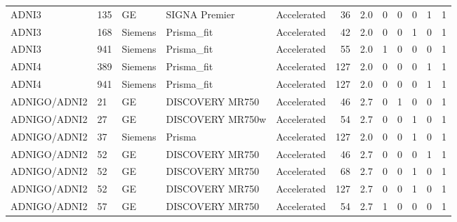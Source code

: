 \documentclass{article}
\providecommand{\DIFaddtex}[1]{{\protect\color{blue}#1}} %
\providecommand{\DIFadd}[1]{\texorpdfstring{\DIFaddtex{#1}}{#1}} %
\begin{document}
\begin{landscape}
\begin{longtable}{lllllrrrrrrr}
\DIFadd{ADNI3 }& \DIFadd{135 }& \DIFadd{GE }& \DIFadd{SIGNA Premier }& \DIFadd{Accelerated }& \DIFadd{36 }& \DIFadd{2.0 }& \DIFadd{0 }& \DIFadd{0 }& \DIFadd{0 }& \DIFadd{1 }& \DIFadd{1 }\\
\DIFadd{ADNI3 }& \DIFadd{168 }& \DIFadd{Siemens }& \DIFadd{Prisma\_fit }& \DIFadd{Accelerated }& \DIFadd{42 }& \DIFadd{2.0 }& \DIFadd{0 }& \DIFadd{0 }& \DIFadd{1 }& \DIFadd{0 }& \DIFadd{1 }\\
\DIFadd{ADNI3 }& \DIFadd{941 }& \DIFadd{Siemens }& \DIFadd{Prisma\_fit }& \DIFadd{Accelerated }& \DIFadd{55 }& \DIFadd{2.0 }& \DIFadd{1 }& \DIFadd{0 }& \DIFadd{0 }& \DIFadd{0 }& \DIFadd{1 }\\
\DIFadd{ADNI4 }& \DIFadd{389 }& \DIFadd{Siemens }& \DIFadd{Prisma\_fit }& \DIFadd{Accelerated }& \DIFadd{127 }& \DIFadd{2.0 }& \DIFadd{0 }& \DIFadd{0 }& \DIFadd{0 }& \DIFadd{1 }& \DIFadd{1 }\\
\DIFadd{ADNI4 }& \DIFadd{941 }& \DIFadd{Siemens }& \DIFadd{Prisma\_fit }& \DIFadd{Accelerated }& \DIFadd{127 }& \DIFadd{2.0 }& \DIFadd{0 }& \DIFadd{0 }& \DIFadd{0 }& \DIFadd{1 }& \DIFadd{1 }\\
\DIFadd{ADNIGO/ADNI2 }& \DIFadd{21 }& \DIFadd{GE }& \DIFadd{DISCOVERY MR750 }& \DIFadd{Accelerated }& \DIFadd{46 }& \DIFadd{2.7 }& \DIFadd{0 }& \DIFadd{1 }& \DIFadd{0 }& \DIFadd{0 }& \DIFadd{1 }\\
\DIFadd{ADNIGO/ADNI2 }& \DIFadd{27 }& \DIFadd{GE }& \DIFadd{DISCOVERY MR750w }& \DIFadd{Accelerated }& \DIFadd{54 }& \DIFadd{2.7 }& \DIFadd{0 }& \DIFadd{0 }& \DIFadd{1 }& \DIFadd{0 }& \DIFadd{1 }\\
\DIFadd{ADNIGO/ADNI2 }& \DIFadd{37 }& \DIFadd{Siemens }& \DIFadd{Prisma }& \DIFadd{Accelerated }& \DIFadd{127 }& \DIFadd{2.0 }& \DIFadd{0 }& \DIFadd{0 }& \DIFadd{1 }& \DIFadd{0 }& \DIFadd{1 }\\
\DIFadd{ADNIGO/ADNI2 }& \DIFadd{52 }& \DIFadd{GE }& \DIFadd{DISCOVERY MR750 }& \DIFadd{Accelerated }& \DIFadd{46 }& \DIFadd{2.7 }& \DIFadd{0 }& \DIFadd{0 }& \DIFadd{0 }& \DIFadd{1 }& \DIFadd{1 }\\
\DIFadd{ADNIGO/ADNI2 }& \DIFadd{52 }& \DIFadd{GE }& \DIFadd{DISCOVERY MR750 }& \DIFadd{Accelerated }& \DIFadd{68 }& \DIFadd{2.7 }& \DIFadd{0 }& \DIFadd{0 }& \DIFadd{1 }& \DIFadd{0 }& \DIFadd{1 }\\
\DIFadd{ADNIGO/ADNI2 }& \DIFadd{52 }& \DIFadd{GE }& \DIFadd{DISCOVERY MR750 }& \DIFadd{Accelerated }& \DIFadd{127 }& \DIFadd{2.7 }& \DIFadd{0 }& \DIFadd{0 }& \DIFadd{1 }& \DIFadd{0 }& \DIFadd{1 }\\
\DIFadd{ADNIGO/ADNI2 }& \DIFadd{57 }& \DIFadd{GE }& \DIFadd{DISCOVERY MR750 }& \DIFadd{Accelerated }& \DIFadd{54 }& \DIFadd{2.7 }& \DIFadd{1 }& \DIFadd{0 }& \DIFadd{0 }& \DIFadd{0 }& \DIFadd{1 }\\

\end{longtable}
\end{landscape}
\end{document}
